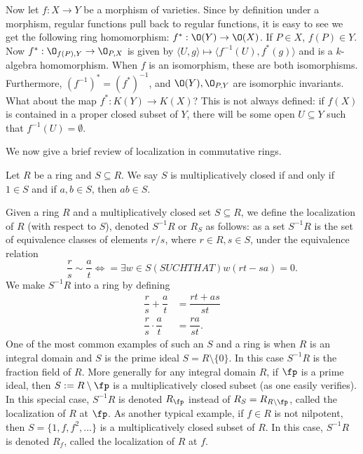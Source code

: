 Now let $f: X \to Y$ be a morphism of varieties. Since by definition under a morphism, regular functions pull back to regular functions, it is easy to see we get the following ring homomorphism: $f^*: \O(Y) \to \O(X)$. If $P \in X$, $f(P) \in Y$. Now $f^*: \O_{f(P),Y} \to \O_{P,X}$ is given by $\langle U, g \rangle \mapsto \langle f^{-1}(U), f^*(g) \rangle$ and is a $k$-algebra homomorphism. When $f$ is an isomorphism, these are both isomorphisms. Furthermore, $(f^{-1})^*= (f^*)^{-1}$, and $\O(Y), \O_{P,Y}$ are isomorphic invariants. What about the map $f^*: K(Y) \to K(X)$? This is not always defined: if $f(X)$ is contained in a proper closed subset of $Y$, there will be some open $U \subseteq Y$ such that $f^{-1}(U)= \emptyset$. 



We now give a brief review of localization in commutative rings.

\begin{dfn}
Let $R$ be a ring and $S \subseteq R$. We say $S$ is multiplicatively closed if and only if $1 \in S$ and if $a,b \in S$, then $ab \in S$. 
\end{dfn}


Given a ring $R$ and a multiplicatively closed set $S \subseteq R$, we define the localization of $R$ (with respect to $S$), denoted $S^{-1}R$ or $R_S$ as follows: as a set $S^{-1}R$ is the set of equivalence classes of elements $r/s$, where $r \in R, s \in S$, under the equivalence relation
	\[
	\dfrac{r}{s} \sim \dfrac{a}{t} \Leftrightarrow= \exists w \in S (SUCH THAT) w(rt-sa)=0.
	\]
We make $S^{-1}R$ into a ring by defining
	\[
	\begin{split}
	\dfrac{r}{s} + \dfrac{a}{t}&= \dfrac{rt+as}{st} \\
	\dfrac{r}{s} \cdot \dfrac{a}{t}&= \dfrac{ra}{st}.
	\end{split}
	\]
One of the most common examples of such an $S$ and a ring is when $R$ is an integral domain and $S$ is the prime ideal $S= R \setminus \{0\}$. In this case $S^{-1}R$ is the fraction field of $R$. More generally for any integral domain $R$, if $\fp$ is a prime ideal, then $S:= R \setminus \fp$ is a multiplicatively closed subset (as one easily verifies). In this special case, $S^{-1}R$ is denoted $R_\fp$ instead of $R_S= R_{R \setminus \fp}$, called the localization of $R$ at $\fp$. As another typical example, if $f \in R$ is not nilpotent, then $S= \{1,f,f^2,\ldots\}$ is a multiplicatively closed subset of $R$. In this case, $S^{-1}R$ is denoted $R_f$, called the localization of $R$ at $f$.


